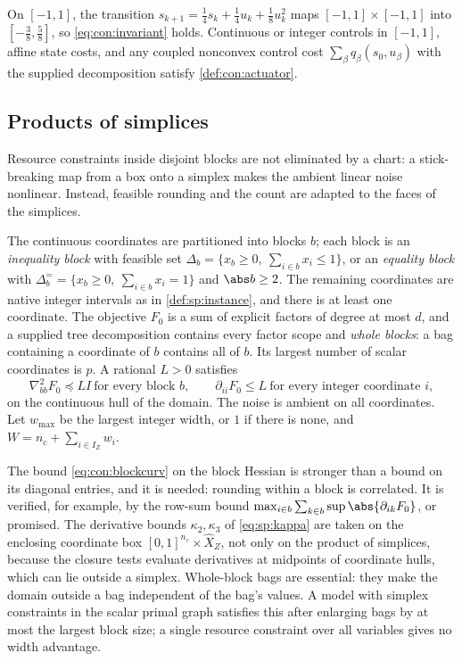 \begin{example}\label{ex:con:actuator}
On $[-1,1]$, the transition $s_{k+1}=\frac14s_k+\frac14u_k+\frac18u_k^2$ maps
$[-1,1]\times[-1,1]$ into $[-\frac38,\frac58]$, so \eqref{eq:con:invariant}
holds. Continuous or integer controls in $[-1,1]$, affine state costs, and
any coupled nonconvex control cost $\sum_\beta q_\beta(s_0,u_\beta)$ with the
supplied decomposition satisfy \cref{def:con:actuator}.
\end{example}

\subsection{Products of simplices}\label{sec:con:simplex}

Resource constraints inside disjoint blocks are not eliminated by a chart: a
stick-breaking map from a box onto a simplex makes the ambient linear noise
nonlinear. Instead, feasible rounding and the count are adapted to the faces
of the simplices.

\begin{definition}\label{def:con:simplex}
The continuous coordinates are partitioned into blocks $b$; each block is an
\emph{inequality block} with feasible set $\Delta_b=\{x_b\ge0,\
\sum_{i\in b}x_i\le1\}$, or an \emph{equality block} with
$\Delta_b^==\{x_b\ge0,\ \sum_{i\in b}x_i=1\}$ and $\abs b\ge2$. The remaining
coordinates are native integer intervals as in \cref{def:sp:instance}, and
there is at least one coordinate. The
objective $F_0$ is a sum of explicit factors of degree at most $d$, and a
supplied tree decomposition contains every factor scope and \emph{whole
blocks}: a bag containing a coordinate of $b$ contains all of $b$. Its
largest number of scalar coordinates is $p$. A rational $L>0$ satisfies
\begin{equation}\label{eq:con:blockcurv}
 \nabla^2_{bb}F_0\preceq LI\ \text{for every block }b,\qquad
 \partial_{ii}F_0\le L\ \text{for every integer coordinate }i,
\end{equation}
on the continuous hull of the domain. The noise is ambient on all
coordinates. Let $w_{\max}$ be the largest integer width, or $1$ if there is
none, and $W=n_c+\sum_{i\in I_Z}w_i$.
\end{definition}

The bound \eqref{eq:con:blockcurv} on the block Hessian is stronger than a
bound on its diagonal entries, and it is needed: rounding within a block is
correlated. It is verified, for example, by the row-sum bound
$\max_{i\in b}\sum_{k\in b}\sup\abs{\partial_{ik}F_0}$, or promised. The
derivative bounds $\kappa_2,\kappa_3$ of \eqref{eq:sp:kappa} are taken on the
enclosing coordinate box $[0,1]^{n_c}\times\widehat X_Z$, not only on the
product of simplices, because the closure tests evaluate derivatives at
midpoints of coordinate hulls, which can lie outside a simplex. Whole-block
bags are essential: they make the domain outside a bag independent of the
bag's values. A model with simplex constraints in the scalar primal graph
satisfies this after enlarging bags by at most the largest block size; a
single resource constraint over all variables gives no width advantage.

